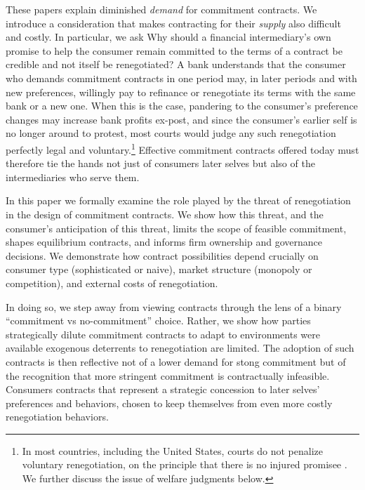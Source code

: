 \documentclass[11pt,english]{article}
\theoremstyle{plain}
\theoremstyle{definition}
\begin{document}
These papers explain diminished \textit{demand} for commitment contracts. We introduce a consideration that makes contracting for their \textit{supply} also difficult and costly. In particular, we ask Why should a financial intermediary's own promise to help the consumer remain committed to the terms of a contract be credible and not itself be renegotiated? A bank understands that the consumer who demands commitment contracts in one period may, in later periods and with new preferences, willingly pay to refinance or renegotiate its terms \textendash{} with the same bank or a new one. When this is the case, pandering to the consumer's preference changes may increase bank profits ex-post, and since the consumer's earlier self is no longer around to protest, most courts would judge any such renegotiation perfectly legal and voluntary.\footnote{In most countries, including the United States, courts do not penalize voluntary renegotiation, on the principle that there is no injured promisee \citep[see discussion in][p448]{laibson1997}. We further discuss the issue of welfare judgments below.} Effective commitment contracts offered today must therefore tie the hands not just of consumers later selves but also of the intermediaries who serve them.

In this paper we formally examine the role played by the threat of renegotiation in the design of commitment contracts. We show how this threat, and the consumer's anticipation of this threat, limits the scope of feasible commitment, shapes equilibrium contracts, and informs firm ownership and governance decisions. We demonstrate how contract possibilities depend crucially on consumer type (sophisticated or naive), market structure (monopoly or competition), and external costs of renegotiation.

In doing so, we step away from viewing contracts through the lens of a binary ``commitment vs no-commitment'' choice. Rather, we show how parties strategically dilute commitment contracts to adapt to environments were available exogenous deterrents to renegotiation are limited. The adoption of such contracts is then reflective not of a lower demand for stong commitment but of the recognition that more stringent commitment is contractually infeasible.
Consumers contracts that represent a strategic concession to later selves' preferences and behaviors, chosen to keep themselves from even more costly renegotiation behaviors.  
\end{document}
